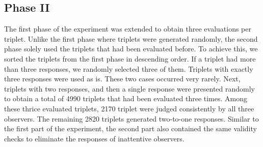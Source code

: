 \subsection{Phase II}
\label{sec:exp_phase_II}
The first phase of the experiment was extended to obtain three evaluations per triplet. Unlike the first phase where triplets were generated randomly, the second phase solely used the triplets that had been evaluated before. To achieve this, we sorted the triplets from the first phase in descending order. If a triplet had more than three responses, we randomly selected three of them. Triplets with exactly three responses were used as is. These two cases occurred very rarely. Next, triplets with two responses, and then a single response were presented randomly to obtain a total of 4990 triplets that had been evaluated three times. Among these thrice evaluated triplets, 2170 triplet were judged consistently by all three observers. The remaining 2820 triplets generated two-to-one responses. Similar to the first part of the experiment, the second part also contained the same validity checks to eliminate the responses of inattentive observers.











